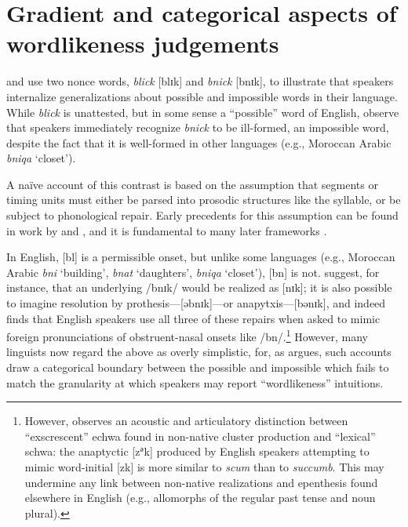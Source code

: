 \chapter{Gradient and categorical aspects of wordlikeness judgements} 
\label{gradience}


\citet{Halle1962} and \citet{Chomsky1965} use two nonce words, \emph{blick} [blɪk] and \emph{bnick} [bnɪk], to illustrate that speakers internalize generalizations about possible and impossible words in their language. While \emph{blick} is unattested, but in some sense a ``possible'' word of English, \citeauthor{Chomsky1965} observe that speakers immediately recognize \emph{bnick} to be ill-formed, an impossible word, despite the fact that it is well-formed in other languages (e.g., Moroccan Arabic \emph{bniqa} `closet'). 

A naïve account of this contrast is based on the assumption that segments or timing units must either be parsed into prosodic structures like the syllable, or be subject to phonological repair. Early precedents for this assumption can be found in work by \citet[10f.]{Hooper1973} and \citet[57f.]{Kahn1976}, and it is fundamental to many later frameworks \citep[e.g.,][]{Ito1989a,Noske1992,OT}.

In English, [bl] is a permissible onset, but unlike some languages (e.g., Moroccan Arabic \emph{bni} `building', \emph{bnat} `daughters', \emph{bniqa} `closet'), [bn] is not. \citet[][19f.]{Wolf2009} suggest, for instance, that an underlying /bnɪk/ would be realized as [nɪk]; it is also possible to imagine resolution by prothesis---[əbnɪk]---or anapytxis---[bənɪk], and indeed \citet{Davidson2006b} finds that English speakers use all three of these repairs when asked to mimic foreign pronunciations of obstruent-nasal onsets like /bn/.\footnote{However, \citet{Davidson2005,Davidson2006a} observes an acoustic and articulatory distinction between ``exscrescent'' echwa found in non-native cluster production and ``lexical'' schwa: the anaptyctic [z${^\textrm{ə}}$k] produced by English speakers attempting to mimic word-initial [zk] is more similar to \emph{scum} than to \emph{succumb}. This may undermine any link between non-native realizations and epenthesis found elsewhere in English (e.g., allomorphs of the regular past tense and noun plural).} However, many linguists now regard the above as overly simplistic, for, as \citeauthor{Shademan2006} argues, such accounts draw a categorical boundary between the possible and impossible which fails to match the granularity at which speakers may report ``wordlikeness'' intuitions.

